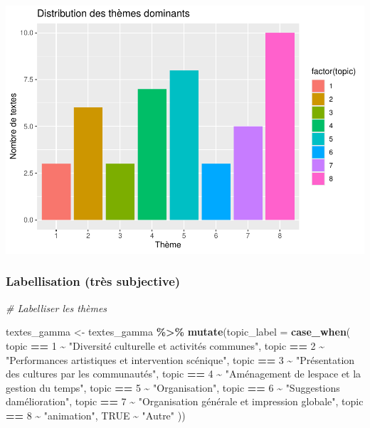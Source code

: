 \documentclass[
]{article}
\newenvironment{Shaded}{\begin{snugshade}}{\end{snugshade}}
\newcommand{\AttributeTok}[1]{\textcolor[rgb]{0.13,0.29,0.53}{#1}}
\newcommand{\CommentTok}[1]{\textcolor[rgb]{0.56,0.35,0.01}{\textit{#1}}}
\newcommand{\ConstantTok}[1]{\textcolor[rgb]{0.56,0.35,0.01}{#1}}
\newcommand{\DecValTok}[1]{\textcolor[rgb]{0.00,0.00,0.81}{#1}}
\newcommand{\FunctionTok}[1]{\textcolor[rgb]{0.13,0.29,0.53}{\textbf{#1}}}
\newcommand{\NormalTok}[1]{#1}
\newcommand{\OtherTok}[1]{\textcolor[rgb]{0.56,0.35,0.01}{#1}}
\newcommand{\SpecialCharTok}[1]{\textcolor[rgb]{0.81,0.36,0.00}{\textbf{#1}}}
\newcommand{\StringTok}[1]{\textcolor[rgb]{0.31,0.60,0.02}{#1}}
\begin{document}
\includegraphics{Texte_mining_files/figure-latex/unnamed-chunk-37-1.pdf}

\subsubsection{Labellisation (très
subjective)}\label{labellisation-truxe8s-subjective}

\begin{Shaded}
\begin{Highlighting}[]
\CommentTok{\# Labelliser les thèmes}

\NormalTok{textes\_gamma }\OtherTok{\textless{}{-}}\NormalTok{ textes\_gamma }\SpecialCharTok{\%\textgreater{}\%}
  \FunctionTok{mutate}\NormalTok{(}\AttributeTok{topic\_label =} \FunctionTok{case\_when}\NormalTok{(}
\NormalTok{    topic }\SpecialCharTok{==} \DecValTok{1} \SpecialCharTok{\textasciitilde{}} \StringTok{"Diversité culturelle et activités communes"}\NormalTok{,}
\NormalTok{    topic }\SpecialCharTok{==} \DecValTok{2} \SpecialCharTok{\textasciitilde{}} \StringTok{"Performances artistiques et intervention scénique"}\NormalTok{,}
\NormalTok{    topic }\SpecialCharTok{==} \DecValTok{3} \SpecialCharTok{\textasciitilde{}} \StringTok{"Présentation des cultures par les communautés"}\NormalTok{,}
\NormalTok{    topic }\SpecialCharTok{==} \DecValTok{4} \SpecialCharTok{\textasciitilde{}} \StringTok{"Aménagement de l\textquotesingle{}espace et la gestion du temps"}\NormalTok{,}
\NormalTok{    topic }\SpecialCharTok{==} \DecValTok{5} \SpecialCharTok{\textasciitilde{}} \StringTok{"Organisation"}\NormalTok{,}
\NormalTok{    topic }\SpecialCharTok{==} \DecValTok{6} \SpecialCharTok{\textasciitilde{}} \StringTok{"Suggestions d\textquotesingle{}amélioration"}\NormalTok{,}
\NormalTok{    topic }\SpecialCharTok{==} \DecValTok{7} \SpecialCharTok{\textasciitilde{}} \StringTok{"Organisation générale et impression globale"}\NormalTok{,}
\NormalTok{    topic }\SpecialCharTok{==} \DecValTok{8} \SpecialCharTok{\textasciitilde{}} \StringTok{"animation"}\NormalTok{,}
    \ConstantTok{TRUE} \SpecialCharTok{\textasciitilde{}} \StringTok{"Autre"}
\NormalTok{  ))}
\end{Highlighting}
\end{Shaded}
\end{document}
